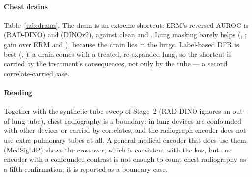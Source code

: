 \paragraph{Chest drains} Table~\ref{tab:drains}. The drain is an extreme shortcut: ERM's reversed AUROC is
\sThreeDrRADDINOermRev{} (RAD-DINO) and \sThreeDrDINOvTwoermRev{} (DINOv2), against clean \sThreeDrRADDINOermClean{} and
\sThreeDrDINOvTwoermClean. Lung masking barely helps (\sThreeDrRADDINOmaskRev, \sThreeDrDINOvTwomaskRev; gain over ERM
\sThreeDrRADDINOMaskGain{} and \sThreeDrDINOvTwoMaskGain), because the drain lies in the lungs. Label-based DFR is best (\sThreeDrRADDINOdfrRev, \sThreeDrDINOvTwodfrRev): a drain comes with a treated,
re-expanded lung, so the shortcut is carried by the treatment's consequences, not only by the tube --- a second
correlate-carried case.

\paragraph{Reading} Together with the synthetic-tube sweep of Stage~2 (RAD-DINO ignores an out-of-lung tube), chest
radiography is a boundary: in-lung devices are confounded with other devices or carried by correlates, and the
radiograph encoder does not use extra-pulmonary tubes at all. A general medical encoder that does use them (MedSigLIP)
shows the crossover, which is consistent with the law, but one encoder with a confounded contrast is not enough to count
chest radiography as a fifth confirmation; it is reported as a boundary case.

